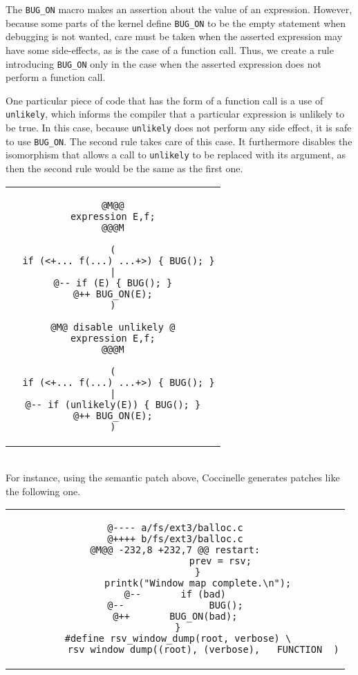 \newpage

The \texttt{BUG\_ON} macro makes an assertion about the value of an
expression. However, because some parts of the kernel define
\texttt{BUG\_ON} to be the empty statement when debugging is not wanted,
care must be taken when the asserted expression may have some side-effects,
as is the case of a function call. Thus, we create a rule introducing
\texttt{BUG\_ON} only in the case when the asserted expression does not
perform a function call.

One particular piece of code that has the form of a function call is a use
of \texttt{unlikely}, which informs the compiler that a particular
expression is unlikely to be true.  In this case, because \texttt{unlikely}
does not perform any side effect, it is safe to use \texttt{BUG\_ON}.  The
second rule takes care of this case.  It furthermore disables the
isomorphism that allows a call to \texttt{unlikely} to be replaced with its
argument, as then the second rule would be the same as the first one.\\

\begin{tabular}{c}
\begin{lstlisting}[language=Cocci,name=bugon]
@M@@
expression E,f;
@@@M

(
  if (<+... f(...) ...+>) { BUG(); }
|
@-- if (E) { BUG(); }
@++ BUG_ON(E);
)

@M@ disable unlikely @
expression E,f;
@@@M

(
  if (<+... f(...) ...+>) { BUG(); }
|
@-- if (unlikely(E)) { BUG(); }
@++ BUG_ON(E);
)
\end{lstlisting}\\
\end{tabular}\\

For instance, using the semantic patch above, Coccinelle generates
patches like the following one.

\begin{tabular}{c}
\begin{lstlisting}[language=PatchC]
@---- a/fs/ext3/balloc.c
@++++ b/fs/ext3/balloc.c
@M@@ -232,8 +232,7 @@ restart:
                prev = rsv;
        }
        printk("Window map complete.\n");
@--       if (bad)
@--               BUG();
@++       BUG_ON(bad);
 }
 #define rsv_window_dump(root, verbose) \
        __rsv_window_dump((root), (verbose), __FUNCTION__)
\end{lstlisting}
\end{tabular}

